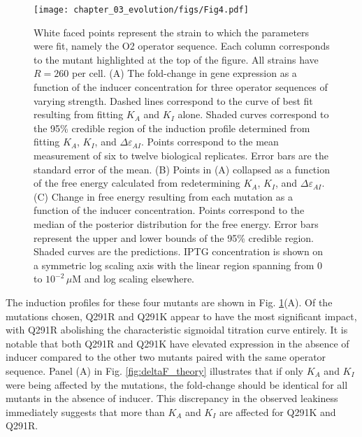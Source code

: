 \begin{figure}[t]
        \centering
        \texttt{[image: chapter\_03\_evolution/figs/Fig4.pdf]}
        \caption[Induction profiles and free energy differences of inducer
        binding domain mutants.]{White faced points represent the strain to
        which the parameters were fit, namely the O2 operator sequence. Each column corresponds to the mutant
        highlighted at the top of the figure. All strains have $R = 260$ per
        cell. (A) The fold-change in gene expression as a function of the
        inducer concentration for three operator sequences of varying 
        strength. Dashed lines correspond to the curve of best fit resulting
        from fitting $K_A$ and $K_I$ alone. Shaded curves correspond to the
        95\% credible region of the induction profile determined from
        fitting $K_A$, $K_I$, and $\Delta\varepsilon_{AI}$. Points
        correspond to the mean measurement of six to twelve biological
        replicates. Error bars are the standard error of the mean. (B) Points
        in (A) collapsed as a function of the free energy calculated from
        redetermining $K_A$, $K_I$, and $\Delta\varepsilon_{AI}$. (C) Change
        in free energy resulting from each mutation as a function of the
        inducer concentration. Points correspond to the median of the
        posterior distribution for the free energy. Error bars represent the
        upper and lower bounds of the 95\% credible region. Shaded curves are
        the predictions. IPTG concentration is shown on a symmetric log scaling
        axis with the linear region spanning from $0$ to $10^{-2}\,\mu$M and log
        scaling elsewhere.}
        \label{fig:IND_muts}
\end{figure}

The induction profiles for these four mutants are shown in Fig.
\ref{fig:IND_muts}(A). Of the mutations chosen, Q291R and Q291K appear to
have the most significant impact,  with Q291R abolishing the characteristic
sigmoidal titration curve entirely. It is notable that both Q291R and Q291K
have elevated expression in the absence of inducer compared to the other two
mutants paired with the same operator sequence. Panel (A) in Fig.
\ref{fig:deltaF_theory} illustrates that if only $K_A$ and $K_I$ were being
affected by the mutations, the fold-change should be identical for all mutants
in the absence of inducer. This discrepancy in the observed leakiness
immediately suggests that more than $K_A$ and $K_I$ are affected for Q291K
and Q291R.

